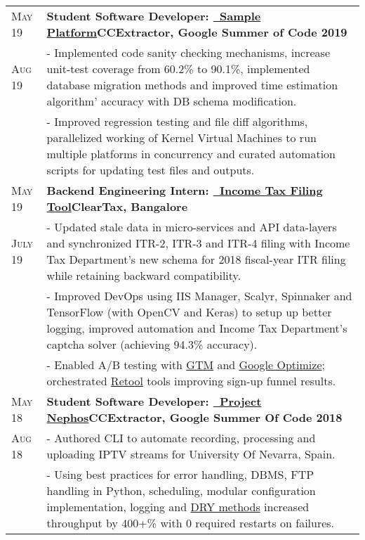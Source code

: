 \documentclass[a4paper,10pt]{extarticle} %
\begin{document}
\begin{tabularx}{\linewidth}{ l | X }

\textsc{May 19} & \textbf{Student Software Developer: {\href{https://github.com/CCExtractor/sample-platform}{\ Sample Platform}}}\hfill\textbf{CCExtractor, Google Summer of Code 2019}\\
\textsc{Aug 19}& {- Implemented code sanity checking mechanisms, increase unit-test coverage from 60.2\% to 90.1\%, implemented database migration methods and improved time estimation algorithm' accuracy with DB schema modification.}\\
& {- Improved regression testing and file diff algorithms, parallelized working of Kernel Virtual Machines to run multiple platforms in concurrency and curated automation scripts for updating test files and outputs.}\\[2mm]

\textsc{May 19} & \textbf{Backend Engineering Intern: {\href{https://cleartax.in/income-tax-efiling}{\ Income Tax Filing Tool}}}\hfill\textbf{ClearTax, Bangalore}\\
\textsc{July 19}& {- Updated stale data in micro-services and API data-layers and synchronized ITR-2, ITR-3 and ITR-4 filing with Income Tax Department's new schema for 2018 fiscal-year ITR filing while retaining backward compatibility.}\\
& {- Improved DevOps using IIS Manager, Scalyr, Spinnaker and TensorFlow (with OpenCV and Keras) to setup up better logging, improved automation and Income Tax Department's captcha solver (achieving 94.3\% accuracy).}\\
& {- Enabled A/B testing with \href{https://tagmanager.google.com/}{GTM} and \href{https://optimize.google.com/optimize/home/}{Google Optimize}; orchestrated \href{https://tryretool.com/}{Retool} tools improving sign-up funnel results.}\\[2mm]

\textsc{May 18} & \textbf{Student Software Developer: {\href{https://github.com/thealphadollar/Nephos}{\ Project Nephos}}}\hfill\textbf{CCExtractor, Google Summer Of Code 2018}\\
\textsc{Aug 18}& {- Authored CLI to automate recording, processing and uploading IPTV streams for University Of Nevarra, Spain.}\\
& {- Using best practices for error handling, DBMS, FTP handling in Python, scheduling, modular configuration implementation, logging and \href{https://thealphadollar.me/learning/2019/05/13/go-dry.html}{DRY methods} increased throughput by 400+\% with 0 required restarts on failures.}\\[2mm]


\end{tabularx}
\end{document}
